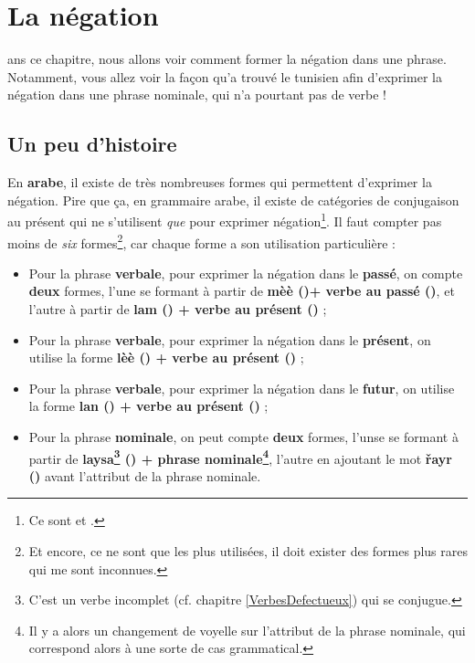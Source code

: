 \chapter{La négation}\label{Négation}
ans ce chapitre, nous allons voir comment former la négation dans une phrase. Notamment, vous allez voir la façon qu'a trouvé le tunisien afin \linebreak d'exprimer la négation dans une phrase nominale, qui n'a pourtant pas de verbe ! 

\section{Un peu d'histoire}
En \textbf{arabe}, il existe de très nombreuses formes qui permettent d'exprimer la négation. Pire que ça, en grammaire arabe, il existe de catégories de conjugaison au présent qui ne s'utilisent \textit{que} pour exprimer négation\footnote{Ce sont  et .}. Il faut compter pas moins de \textit{six} formes\footnote{Et encore, ce ne sont que les plus utilisées, il doit exister des formes plus rares qui me sont inconnues.}, car chaque forme a son utilisation particulière :

\begin{itemize}
    \item Pour la phrase \textbf{verbale}, pour exprimer la négation dans le \textbf{passé}, on compte \textbf{deux} formes, l'une se formant à partir de \textbf{mèè ()+ verbe au passé ()}, et l'autre à partir de \textbf{lam () + verbe au présent ()} ;
    \item Pour la phrase \textbf{verbale}, pour exprimer la négation dans le \textbf{présent}, on utilise la forme \textbf{lèè () + verbe au présent ()} ; 
    \item Pour la phrase \textbf{verbale}, pour exprimer la négation dans le \textbf{futur}, on utilise la forme \textbf{lan () + verbe au présent ()} ;
    \item Pour la phrase \textbf{nominale}, on peut compte \textbf{deux} formes, l'unse se formant à partir de \textbf{laysa\footnote{C'est un verbe incomplet (cf. chapitre \ref{VerbesDefectueux}) qui se conjugue.} () + phrase nominale\footnote{Il y a alors un changement de voyelle sur l'attribut de la phrase nominale, qui correspond alors à une sorte de cas grammatical.}}, l'autre en ajoutant le mot \textbf{\v{r}ayr ()} avant l'attribut de la phrase nominale.
\end{itemize}

